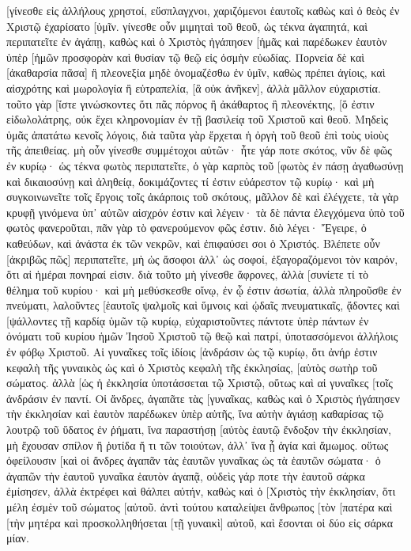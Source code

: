 [γίνεσθε εἰς ἀλλήλους χρηστοί, εὔσπλαγχνοι, χαριζόμενοι ἑαυτοῖς καθὼς καὶ ὁ θεὸς ἐν Χριστῷ ἐχαρίσατο [ὑμῖν. 
γίνεσθε οὖν μιμηταὶ τοῦ θεοῦ, ὡς τέκνα ἀγαπητά, 
καὶ περιπατεῖτε ἐν ἀγάπῃ, καθὼς καὶ ὁ Χριστὸς ἠγάπησεν [ἡμᾶς καὶ παρέδωκεν ἑαυτὸν ὑπὲρ [ἡμῶν προσφορὰν καὶ θυσίαν τῷ θεῷ εἰς ὀσμὴν εὐωδίας. 
Πορνεία δὲ καὶ [ἀκαθαρσία πᾶσα] ἢ πλεονεξία μηδὲ ὀνομαζέσθω ἐν ὑμῖν, καθὼς πρέπει ἁγίοις, 
καὶ αἰσχρότης καὶ μωρολογία ἢ εὐτραπελία, [ἃ οὐκ ἀνῆκεν], ἀλλὰ μᾶλλον εὐχαριστία. 
τοῦτο γὰρ [ἴστε γινώσκοντες ὅτι πᾶς πόρνος ἢ ἀκάθαρτος ἢ πλεονέκτης, [ὅ ἐστιν εἰδωλολάτρης, οὐκ ἔχει κληρονομίαν ἐν τῇ βασιλείᾳ τοῦ Χριστοῦ καὶ θεοῦ. 
Μηδεὶς ὑμᾶς ἀπατάτω κενοῖς λόγοις, διὰ ταῦτα γὰρ ἔρχεται ἡ ὀργὴ τοῦ θεοῦ ἐπὶ τοὺς υἱοὺς τῆς ἀπειθείας. 
μὴ οὖν γίνεσθε συμμέτοχοι αὐτῶν· 
ἦτε γάρ ποτε σκότος, νῦν δὲ φῶς ἐν κυρίῳ· ὡς τέκνα φωτὸς περιπατεῖτε, 
ὁ γὰρ καρπὸς τοῦ [φωτὸς ἐν πάσῃ ἀγαθωσύνῃ καὶ δικαιοσύνῃ καὶ ἀληθείᾳ, 
δοκιμάζοντες τί ἐστιν εὐάρεστον τῷ κυρίῳ· 
καὶ μὴ συγκοινωνεῖτε τοῖς ἔργοις τοῖς ἀκάρποις τοῦ σκότους, μᾶλλον δὲ καὶ ἐλέγχετε, 
τὰ γὰρ κρυφῇ γινόμενα ὑπ᾽ αὐτῶν αἰσχρόν ἐστιν καὶ λέγειν· 
τὰ δὲ πάντα ἐλεγχόμενα ὑπὸ τοῦ φωτὸς φανεροῦται, 
πᾶν γὰρ τὸ φανερούμενον φῶς ἐστιν. διὸ λέγει· Ἔγειρε, ὁ καθεύδων, καὶ ἀνάστα ἐκ τῶν νεκρῶν, καὶ ἐπιφαύσει σοι ὁ Χριστός. 
Βλέπετε οὖν [ἀκριβῶς πῶς] περιπατεῖτε, μὴ ὡς ἄσοφοι ἀλλ᾽ ὡς σοφοί, 
ἐξαγοραζόμενοι τὸν καιρόν, ὅτι αἱ ἡμέραι πονηραί εἰσιν. 
διὰ τοῦτο μὴ γίνεσθε ἄφρονες, ἀλλὰ [συνίετε τί τὸ θέλημα τοῦ κυρίου· 
καὶ μὴ μεθύσκεσθε οἴνῳ, ἐν ᾧ ἐστιν ἀσωτία, ἀλλὰ πληροῦσθε ἐν πνεύματι, 
λαλοῦντες [ἑαυτοῖς ψαλμοῖς καὶ ὕμνοις καὶ ᾠδαῖς πνευματικαῖς, ᾄδοντες καὶ [ψάλλοντες τῇ καρδίᾳ ὑμῶν τῷ κυρίῳ, 
εὐχαριστοῦντες πάντοτε ὑπὲρ πάντων ἐν ὀνόματι τοῦ κυρίου ἡμῶν Ἰησοῦ Χριστοῦ τῷ θεῷ καὶ πατρί, 
ὑποτασσόμενοι ἀλλήλοις ἐν φόβῳ Χριστοῦ. 
Αἱ γυναῖκες τοῖς ἰδίοις [ἀνδράσιν ὡς τῷ κυρίῳ, 
ὅτι ἀνήρ ἐστιν κεφαλὴ τῆς γυναικὸς ὡς καὶ ὁ Χριστὸς κεφαλὴ τῆς ἐκκλησίας, [αὐτὸς σωτὴρ τοῦ σώματος. 
ἀλλὰ [ὡς ἡ ἐκκλησία ὑποτάσσεται τῷ Χριστῷ, οὕτως καὶ αἱ γυναῖκες [τοῖς ἀνδράσιν ἐν παντί. 
Οἱ ἄνδρες, ἀγαπᾶτε τὰς [γυναῖκας, καθὼς καὶ ὁ Χριστὸς ἠγάπησεν τὴν ἐκκλησίαν καὶ ἑαυτὸν παρέδωκεν ὑπὲρ αὐτῆς, 
ἵνα αὐτὴν ἁγιάσῃ καθαρίσας τῷ λουτρῷ τοῦ ὕδατος ἐν ῥήματι, 
ἵνα παραστήσῃ [αὐτὸς ἑαυτῷ ἔνδοξον τὴν ἐκκλησίαν, μὴ ἔχουσαν σπίλον ἢ ῥυτίδα ἤ τι τῶν τοιούτων, ἀλλ᾽ ἵνα ᾖ ἁγία καὶ ἄμωμος. 
οὕτως ὀφείλουσιν [καὶ οἱ ἄνδρες ἀγαπᾶν τὰς ἑαυτῶν γυναῖκας ὡς τὰ ἑαυτῶν σώματα· ὁ ἀγαπῶν τὴν ἑαυτοῦ γυναῖκα ἑαυτὸν ἀγαπᾷ, 
οὐδεὶς γάρ ποτε τὴν ἑαυτοῦ σάρκα ἐμίσησεν, ἀλλὰ ἐκτρέφει καὶ θάλπει αὐτήν, καθὼς καὶ ὁ [Χριστὸς τὴν ἐκκλησίαν, 
ὅτι μέλη ἐσμὲν τοῦ σώματος [αὐτοῦ. 
ἀντὶ τούτου καταλείψει ἄνθρωπος [τὸν [πατέρα καὶ [τὴν μητέρα καὶ προσκολληθήσεται [τῇ γυναικὶ] αὐτοῦ, καὶ ἔσονται οἱ δύο εἰς σάρκα μίαν. 
